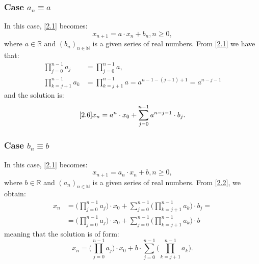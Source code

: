 \documentclass[a4paper,11pt]{report}
\newcommand{\R}{\mathbb{R}}
\begin{document}
\subsubsection{Case $a_{n}\equiv a$} \label{i}
In this case, \eqref{2.1} becomes:
\begin{equation}
\label{2.6}
 x_{n+1}=a\cdot x_{n}+b_{n}, n\geq 0,
\end{equation}
where $a\in \R$ and $(b_{n})_{n\in\mathbb{N}}$ is a given series of real numbers.
From \eqref{2.1} we have that:
\begin{align*}
 \prod_{j=0}^{n-1} a_{j} &=\prod_{j=0}^{n-1} a,\\
 \prod_{k=j+1}^{n-1} a_{k}&=\prod_{k=j+1}^{n-1} a=a^{n-1-(j+1)+1}=a^{n-j-1}
\end{align*}
and the solution is:
\begin{equation}\eqref{2.6}
 x_{n}=a^{n}\cdot x_{0}+\sum_{j=0}^{n-1} a^{n-j-1}\cdot b_{j}.
\end{equation}

\subsubsection{Case $b_{n}\equiv b$}\label{2.1.1.2}
In this case, \eqref{2.1} becomes:
\begin{equation}\label{2.7}
 x_{n+1}=a_{n}\cdot x_{n}+b, n\geq 0,
\end{equation}
where $b\in\R$ and $(a_{n})_{n\in\mathbb{N}}$ is a given series of real numbers.
From \eqref{2.2}, we obtain:
\begin{align*}
 x_{n} &= \bigg( \prod_{j=0}^{n-1} a_{j} \bigg) \cdot x_{0} + \sum_{j=0}^{n-1}\bigg(\prod_{k=j+1}^{n-1} a_{k}\bigg)\cdot b_{j} =\\
 &= \bigg( \prod_{j=0}^{n-1} a_{j} \bigg) \cdot x_{0} + \sum_{j=0}^{n-1}\bigg(\prod_{k=j+1}^{n-1} a_{k}\bigg)\cdot b
\end{align*}
meaning that the solution is of form:
\begin{equation}
 x_{n}=\bigg( \prod_{j=0}^{n-1} a_{j} \bigg)\cdot x_{0}+b\cdot\sum_{j=0}^{n-1}\bigg(\prod_{k=j+1}^{n-1} a_{k}\bigg).
\end{equation}
\end{document}
